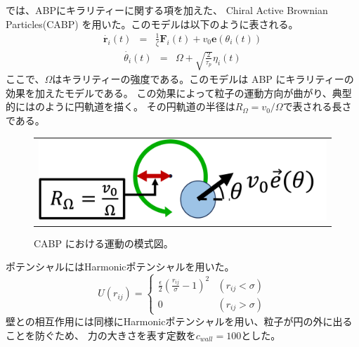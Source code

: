\documentclass[/Users/ikedahajime/GitHub/reserch/master_report/thesis]{subfiles}
\begin{document}
では、ABPにキラリティーに関する項を加えた、 Chiral Active Brownian Particles(CABP)\cite{maDrivingDynamicColloidal2017}%
を用いた。このモデルは以下のように表される。
\begin{eqnarray}\label{eq:eom_CABP_1}
    \dot{\bm{r}_i}(t) &=& \frac{1}{\zeta} \bm{F}_i(t)+v_0 \bm{e}(\theta_i (t))
\end{eqnarray}
\begin{eqnarray}\label{eq:eom_CABP_2}
    \dot{\theta_i }(t) &=& \Omega+\sqrt{\frac{2}{\tau_p}}\eta_i(t)
\end{eqnarray}
ここで、$\Omega$はキラリティーの強度である。このモデルは ABP にキラリティーの効果を加えたモデルである。
この効果によって粒子の運動方向が曲がり、典型的にはのように円軌道を描く。
その円軌道の半径は$R_\Omega=v_0/\Omega$で表される長さである。
\begin{figure}
    \centering
    \begin{tabular}{c}
        \begin{minipage}{0.6\hsize}
            \includegraphics[width=\textwidth]{img/method/cabp_motion.png}
        \end{minipage}
    \end{tabular}
    \caption[Four sample images]
    {
        CABP における運動の模式図。
    }
    \label{fig:cabp_motion_sample}
\end{figure}

ポテンシャルにはHarmonicポテンシャルを用いた。
\begin{equation}
    U(r_{ij})=
    \begin{cases}
        \frac{\epsilon}{2}\left(\frac{r_{ij}}{\sigma}-1\right)^2 &(r_{ij}<\sigma)\\
        0 & (r_{ij}>\sigma)

    \end{cases}
\end{equation}
壁との相互作用には同様にHarmonicポテンシャルを用い、粒子が円の外に出ることを防ぐため、
力の大きさを表す定数を$c_{wall}=100$とした。
\end{document}
